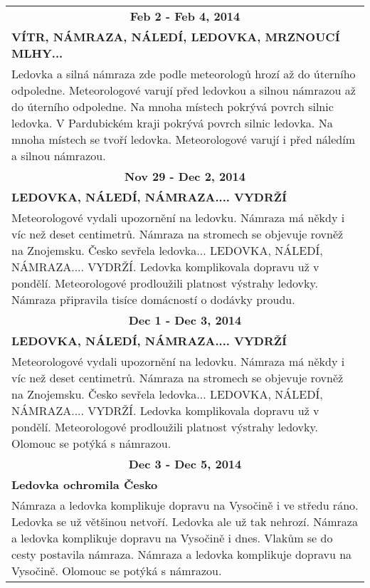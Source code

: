 \begin{tabularx}{\linewidth}{l l}
                \multicolumn{2}{c}{\bf Feb 2 - Feb 4, 2014} \\
                \multicolumn{2}{p{\linewidth}}{\bf VÍTR, NÁMRAZA, NÁLEDÍ, LEDOVKA, MRZNOUCÍ MLHY...} \\
                \multicolumn{2}{p{\linewidth}}{Ledovka a silná námraza zde podle meteorologů hrozí až do úterního odpoledne. Meteorologové varují před ledovkou a silnou námrazou až do úterního odpoledne. Na mnoha místech pokrývá povrch silnic ledovka. V Pardubickém kraji pokrývá povrch silnic ledovka. Na mnoha místech se tvoří ledovka. Meteorologové varují i před náledím a silnou námrazou.} \\ \midrule
                
                \multicolumn{2}{c}{\bf Nov 29 - Dec 2, 2014} \\
                \multicolumn{2}{p{\linewidth}}{\bf LEDOVKA, NÁLEDÍ, NÁMRAZA.... VYDRŽÍ} \\
                \multicolumn{2}{p{\linewidth}}{Meteorologové vydali upozornění na ledovku. Námraza má někdy i víc než deset centimetrů. Námraza na stromech se objevuje rovněž na Znojemsku. Česko sevřela ledovka... LEDOVKA, NÁLEDÍ, NÁMRAZA.... VYDRŽÍ. Ledovka komplikovala dopravu už v pondělí. Meteorologové prodloužili platnost výstrahy ledovky. Námraza připravila tisíce domácností o dodávky proudu.} \\ \midrule
                
                \multicolumn{2}{c}{\bf Dec 1 - Dec 3, 2014} \\
                \multicolumn{2}{p{\linewidth}}{\bf LEDOVKA, NÁLEDÍ, NÁMRAZA.... VYDRŽÍ} \\
                \multicolumn{2}{p{\linewidth}}{Meteorologové vydali upozornění na ledovku. Námraza má někdy i víc než deset centimetrů. Námraza na stromech se objevuje rovněž na Znojemsku. Česko sevřela ledovka... LEDOVKA, NÁLEDÍ, NÁMRAZA.... VYDRŽÍ. Ledovka komplikovala dopravu už v pondělí. Meteorologové prodloužili platnost výstrahy ledovky. Olomouc se potýká s námrazou.} \\ \midrule
                
                \multicolumn{2}{c}{\bf Dec 3 - Dec 5, 2014} \\
                \multicolumn{2}{p{\linewidth}}{\bf Ledovka ochromila Česko} \\
                \multicolumn{2}{p{\linewidth}}{Námraza a ledovka komplikuje dopravu na Vysočině i ve středu ráno. Ledovka se už většinou netvoří.  Ledovka ale už tak nehrozí. Námraza a ledovka komplikuje dopravu na Vysočině i dnes. Vlakům se do cesty postavila námraza. Námraza a ledovka komplikuje dopravu na Vysočině. Olomouc se potýká s námrazou.} \\ \midrule
                

\end{tabularx}
